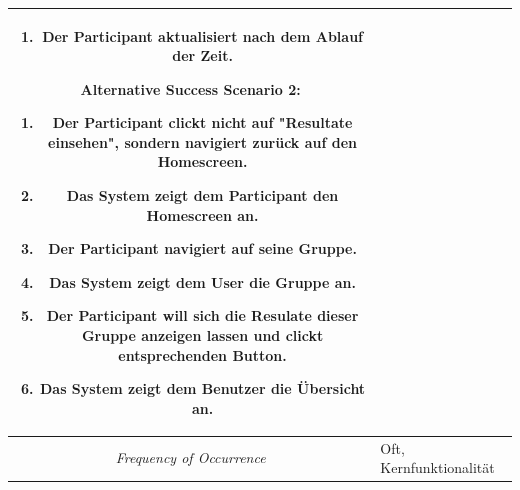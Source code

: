 \begin{center}
\begin{longtable}{| c | p{7cm} |}
\begin{enumerate}[label=1.\alph*,noitemsep]
			\item Der Participant aktualisiert nach dem Ablauf der Zeit.
		\end{enumerate}
		Alternative Success Scenario 2:
		\begin{enumerate}[label=4.\alph*,noitemsep]
			\item Der Participant clickt nicht auf "Resultate einsehen", sondern navigiert zurück auf den Homescreen.
			\item Das System zeigt dem Participant den Homescreen an.
			\item Der Participant navigiert auf seine Gruppe.
			\item Das System zeigt dem User die Gruppe an.
			\item Der Participant will sich die Resulate dieser Gruppe anzeigen lassen und clickt entsprechenden Button.
			\item Das System zeigt dem Benutzer die Übersicht an.
		\end{enumerate}\\
		\hline
		\textit{Frequency of Occurrence} & Oft, Kernfunktionalität\\
		\hline
	\end{longtable}
\end{center}



